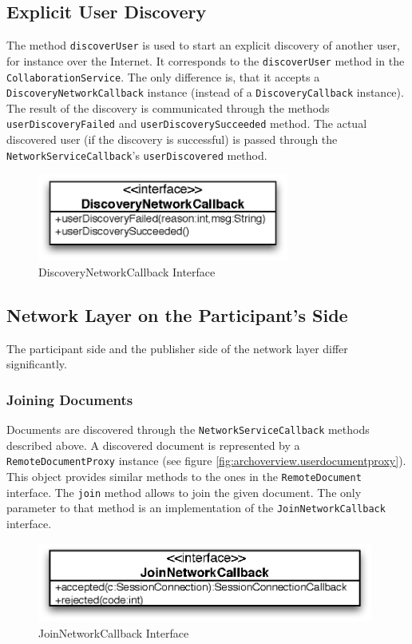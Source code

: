 \subsection{Explicit User Discovery}
The method \texttt{discoverUser} is used to start an explicit discovery
of another user, for instance over the Internet. It corresponds to the
\texttt{discoverUser} method in the \texttt{CollaborationService}. The
only difference is, that it accepts a \texttt{DiscoveryNetworkCallback}
instance (instead of a \texttt{DiscoveryCallback} instance). The result
of the discovery is communicated through the methods 
\texttt{userDiscoveryFailed} and \texttt{userDiscoverySucceeded} method.
The actual discovered user (if the discovery is successful) is passed 
through the \texttt{NetworkServiceCallback}'s \texttt{userDiscovered} 
method.

\begin{figure}[H]
 \centering
 \includegraphics[width=8.26cm,height=2.86cm]{../images/finalreport/architecture_discoverynetworkcallback_uml.eps}
 \caption{DiscoveryNetworkCallback Interface}
\end{figure}


\subsection{Network Layer on the Participant's Side}
The participant side and the publisher side of the network layer differ
significantly.

\subsubsection{Joining Documents}
Documents are discovered through the \texttt{NetworkServiceCallback} methods
described above. A discovered document is represented by a 
\texttt{RemoteDocumentProxy} instance
(see figure \ref{fig:archoverview.userdocumentproxy}). 
This object provides similar methods
to the ones in the \texttt{RemoteDocument} interface. The \texttt{join}
method allows to join the given document. The only parameter to that method
is an implementation of the \texttt{JoinNetworkCallback} interface.

\begin{figure}[H]
 \centering
 \includegraphics[width=11.04cm,height=2.61cm]{../images/finalreport/architecture_joinnetworkcallback_uml.eps}
 \caption{JoinNetworkCallback Interface}
\end{figure}


